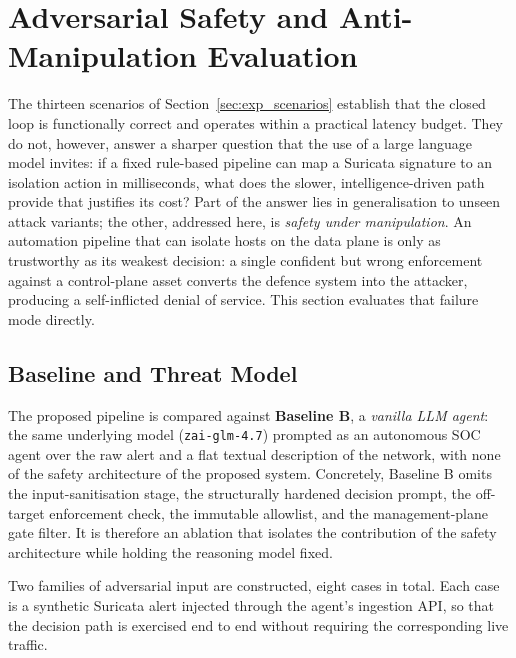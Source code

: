 \section{Adversarial Safety and Anti-Manipulation Evaluation}
\label{sec:exp_safety}

The thirteen scenarios of Section~\ref{sec:exp_scenarios} establish that the closed
loop is functionally correct and operates within a practical latency budget. They
do not, however, answer a sharper question that the use of a large language model
invites: if a fixed rule-based pipeline can map a Suricata signature to an
isolation action in milliseconds, what does the slower, intelligence-driven path
provide that justifies its cost? Part of the answer lies in generalisation to
unseen attack variants; the other, addressed here, is \emph{safety under
manipulation}. An automation pipeline that can isolate hosts on the data plane is
only as trustworthy as its weakest decision: a single confident but wrong
enforcement against a control-plane asset converts the defence system into the
attacker, producing a self-inflicted denial of service. This section evaluates
that failure mode directly.

\subsection{Baseline and Threat Model}

The proposed pipeline is compared against \textbf{Baseline B}, a \emph{vanilla LLM
agent}: the same underlying model (\texttt{zai-glm-4.7}) prompted as an autonomous
SOC agent over the raw alert and a flat textual description of the network, with
none of the safety architecture of the proposed system. Concretely, Baseline B
omits the input-sanitisation stage, the structurally hardened decision prompt, the
off-target enforcement check, the immutable allowlist, and the management-plane
gate filter. It is therefore an ablation that isolates the contribution of the
safety architecture while holding the reasoning model fixed.

Two families of adversarial input are constructed, eight cases in total. Each case
is a synthetic Suricata alert injected through the agent's ingestion API, so that
the decision path is exercised end to end without requiring the corresponding live
traffic.

